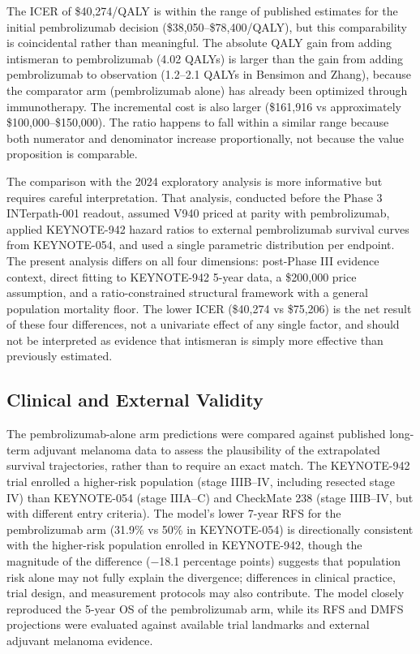 \documentclass[12pt,a4paper]{article}
\begin{document}
The ICER of \$40,274/QALY is within the range of published estimates for the initial \mbox{pembrolizumab} decision (\$38,050--\$78,400/QALY), but this comparability is coincidental rather than meaningful. The absolute QALY gain from adding intismeran to \mbox{pembrolizumab} (4.02 QALYs) is larger than the gain from adding \mbox{pembrolizumab} to observation (1.2--2.1 QALYs in Bensimon and Zhang), because the comparator arm (\mbox{pembrolizumab} alone) has already been optimized through immunotherapy. The incremental cost is also larger (\$161,916 vs approximately \$100,000--\$150,000). The ratio happens to fall within a similar range because both numerator and denominator increase proportionally, not because the value proposition is comparable.

The comparison with the 2024 exploratory analysis \cite{mclean2024} is more informative but requires careful interpretation. That analysis, conducted before the Phase 3 \mbox{INTerpath-001} readout, assumed V940 priced at parity with \mbox{pembrolizumab}, applied \mbox{KEYNOTE-942} hazard ratios to external \mbox{pembrolizumab} survival curves from KEYNOTE-054, and used a single parametric distribution per endpoint. The present analysis differs on all four dimensions: post-Phase III evidence context, direct fitting to \mbox{KEYNOTE-942} 5-year data, a \$200,000 price assumption, and a ratio-constrained structural framework with a general population mortality floor. The lower ICER (\$40,274 vs \$75,206) is the net result of these four differences, not a univariate effect of any single factor, and should not be interpreted as evidence that intismeran is simply more effective than previously estimated.

\subsection{Clinical and External Validity}

The \mbox{pembrolizumab}-alone arm predictions were compared against published long-term adjuvant melanoma data to assess the plausibility of the extrapolated survival trajectories, rather than to require an exact match. The \mbox{KEYNOTE-942} trial enrolled a higher-risk population (stage IIIB--IV, including resected stage IV) than KEYNOTE-054 (stage IIIA--C) and CheckMate 238 (stage IIIB--IV, but with different entry criteria). The model's lower 7-year RFS for the \mbox{pembrolizumab} arm (31.9\% vs 50\% in KEYNOTE-054) is directionally consistent with the higher-risk population enrolled in \mbox{KEYNOTE-942}, though the magnitude of the difference ($-$18.1 percentage points) suggests that population risk alone may not fully explain the divergence; differences in clinical practice, trial design, and measurement protocols may also contribute. The model closely reproduced the 5-year OS of the \mbox{pembrolizumab} arm, while its RFS and DMFS projections were evaluated against available trial landmarks and external adjuvant melanoma evidence.
\end{document}
